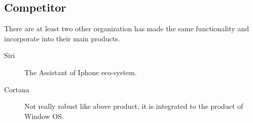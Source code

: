 \subsection*{Competitor}

There are at least two other organization has made the same functionality and incorporate into their main products.

\begin{description}

	\item[Siri] The Assistant of Iphone eco-system.
	\item[Cortana] Not really robust like above product, it is integrated to the product of Window OS.

\end{description}